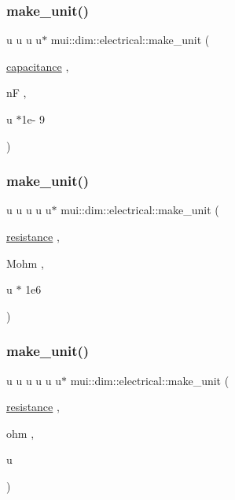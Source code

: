 \subsubsection{\texorpdfstring{make\+\_\+unit()}{make\_unit()}\hspace{0.1cm}{\footnotesize\ttfamily [5/7]}}
{\footnotesize\ttfamily u u u u$\ast$ mui\+::dim\+::electrical\+::make\+\_\+unit (\begin{DoxyParamCaption}\item[{\hyperlink{namespacemui_1_1dim_1_1electrical_ab6fce13543150792566ab8449ce7ef0e}{capacitance}}]{,  }\item[{nF}]{,  }\item[{u $\ast$1e-\/}]{9 }\end{DoxyParamCaption})}

\mbox{\label{namespacemui_1_1dim_1_1electrical_aa5e26d2e47e3442aa83657b98e4098d7}} 
\subsubsection{\texorpdfstring{make\+\_\+unit()}{make\_unit()}\hspace{0.1cm}{\footnotesize\ttfamily [6/7]}}
{\footnotesize\ttfamily u u u u u$\ast$ mui\+::dim\+::electrical\+::make\+\_\+unit (\begin{DoxyParamCaption}\item[{\hyperlink{namespacemui_1_1dim_1_1electrical_a86a4b6ba2ef40975afac4dd629e07d3b}{resistance}}]{,  }\item[{Mohm}]{,  }\item[{u $\ast$}]{1e6 }\end{DoxyParamCaption})}

\mbox{\label{namespacemui_1_1dim_1_1electrical_a5904c845f3ffb933619767cbb53b7a89}} 
\subsubsection{\texorpdfstring{make\+\_\+unit()}{make\_unit()}\hspace{0.1cm}{\footnotesize\ttfamily [7/7]}}
{\footnotesize\ttfamily u u u u u u$\ast$ mui\+::dim\+::electrical\+::make\+\_\+unit (\begin{DoxyParamCaption}\item[{\hyperlink{namespacemui_1_1dim_1_1electrical_a86a4b6ba2ef40975afac4dd629e07d3b}{resistance}}]{,  }\item[{ohm}]{,  }\item[{u}]{ }\end{DoxyParamCaption})}



